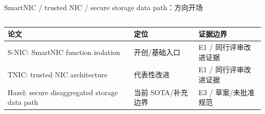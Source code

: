 \begin{frame}[t,shrink=6]{SmartNIC / trusted NIC / secure storage data path：方向开场}
\begin{columns}[T,totalwidth=\textwidth]
\begin{column}{0.49\textwidth}
{\begin{minipage}[t]{0.97\linewidth}
\begin{minipage}{0.92\linewidth}
{\begin{tabularx}{\linewidth}{@{}YYY@{}}
\toprule
\textbf{论文} & \textbf{定位} & \textbf{证据边界} \\
\midrule
S-NIC: SmartNIC function isolation & 开创/基础入口 & E1 / 同行评审改进证据 \\
TNIC: trusted NIC architecture & 代表性改进 & E1 / 同行评审改进证据 \\
Hazel: secure disaggregated storage data path & 当前 SOTA/补充边界 & E3 / 草案/未批准规范 \\
\bottomrule
\end{tabularx}
}
    \end{minipage}
    \vspace{1mm}
  \end{minipage}}
  \end{column}
\end{columns}
\end{frame}


